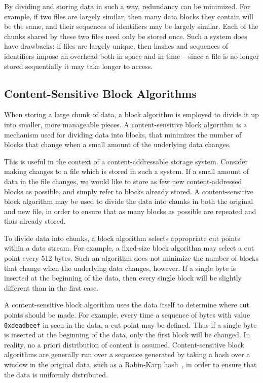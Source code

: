 \documentclass{sigplanconf}[11pt]
\begin{document}
By dividing and storing data in such a way, redundancy can be minimized.  For
example, if two files are largely similar, then many data blocks they contain
will be the same, and their sequences of identifiers may be largely similar.
Each of the chunks shared by these two files need only be stored once.  Such a
system does have drawbacks: if files are largely unique, then hashes and
sequences of identifiers impose an overhead both in space and in time -- since a
file is no longer stored sequentially it may take longer to access.

\subsection*{Content-Sensitive Block Algorithms}

When storing a large chunk of data, a block algorithm is employed to divide it
up into smaller, more manageable pieces.  A content-sensitive block algorithm
is a mechanism used for dividing data into blocks, that minimizes the number of
blocks that change when a small amount of the underlying data changes.

This is useful in the context of a content-addressable storage system.
Consider making changes to a file which is stored in such a system.  If a small
amount of data in the file changes, we would like to store as few new
content-addressed blocks as possible, and simply refer to blocks already
stored.  A content-sensitive block algorithm may be used to divide the data
into chunks in both the original and new file, in order to ensure that as many
blocks as possible are repeated and thus already stored.

To divide data into chunks, a block algorithm selects appropriate cut points
within a data stream.  For example, a fixed-size block algorithm may select a cut
point every 512 bytes.  Such an algorithm does not minimize the number of
blocks that change when the underlying data changes, however.  If a single byte
is inserted at the beginning of the data, then every single block will be
slightly different than in the first case.

A content-sensitive block algorithm uses the data itself to determine where cut
points should be made.  For example, every time a sequence of bytes with value
{\tt 0xdeadbeef} in seen in the data, a cut point may be defined.  Thus if a
single byte is inserted at the beginning of the data, only the first block will
be changed.  In reality, no a priori distribution of content is assumed.
Content-sensitive block algorithms are generally run over a sequence generated
by taking a hash over a window in the original data, such as a Rabin-Karp
hash~\cite{rabin}, in order to ensure that the data is uniformly distributed.
\end{document}
